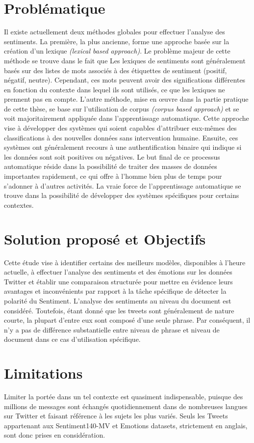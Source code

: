 \section{Problématique}
Il existe actuellement deux méthodes globales pour
effectuer l'analyse des sentiments. La première, la plus ancienne, forme une approche basée sur la
création d'un lexique \textit{(lexical based approach)}. Le problème majeur de cette méthode se trouve
dans le fait que Les lexiques de sentiments sont généralement basés sur des listes de mots associés à des étiquettes de sentiment (positif, négatif, neutre). Cependant, ces mots peuvent avoir des significations différentes en fonction du contexte dans lequel ils sont utilisés, ce que les lexiques ne prennent pas en compte. L'autre méthode, mise en œuvre dans la partie pratique de cette thèse, se base sur
l'utilisation de corpus \textit{(corpus based approach)} et se voit majoritairement appliquée dans
l'apprentissage automatique. Cette approche vise à développer des systèmes qui soient capables
d'attribuer eux-mêmes des classifications à des nouvelles données sans intervention humaine.
Ensuite, ces systèmes ont généralement recours à une authentification binaire qui indique si les
données sont soit positives ou négatives. Le but final de ce processus automatique réside dans la
possibilité de traiter des masses de données importantes rapidement, ce qui offre à l'homme bien
plus de temps pour s'adonner à d'autres activités. La vraie force de l'apprentissage automatique se
trouve dans la possibilité de développer des systèmes spécifiques pour certains contextes. 
\section{Solution proposé et Objectifs}
Cette étude vise à identifier certains des meilleurs modèles, disponibles à l'heure actuelle, à effectuer l'analyse des sentiments et des émotions  sur les données Twitter et établir une comparaison structurée pour mettre en évidence leurs avantages et inconvénients par rapport à la tâche spécifique de détecter la polarité du Sentiment. L'analyse des sentiments au niveau du document est considéré. Toutefois, étant donné que les tweets sont généralement de nature courte, la plupart d'entre eux sont
composé d'une seule phrase. Par conséquent, il n'y a pas de différence substantielle entre niveau de phrase et niveau de document dans ce cas d'utilisation spécifique.

\section{Limitations}
 Limiter la portée dans un tel contexte est quasiment indispensable, puisque des millions de messages sont échangés quotidiennement dans de nombreuses langues sur Twitter et faisant référence à les sujets les plus variés. Seuls les Tweets appartenant aux Sentiment140-MV et Emotions datasets, strictement en anglais, sont donc prises en considération.
